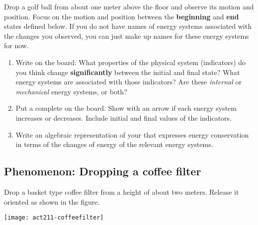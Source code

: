 Drop a golf ball from about one meter above the floor and observe its motion and position.  Focus on the motion and position between the \textbf{beginning} and \textbf{end} states defined below. If you do not have names of energy systems associated with the changes you observed, you can just make up names for these energy systems for now.

\begin{center}
\end{center}

\begin{enumerate}
	\item Write on the board: What properties of the physical system (indicators) do you think change \textbf{significantly} between the initial and final state?  What energy systems are associated with those indicators?  Are these \emph{internal} or \emph{mechanical} energy systems, or both?
	\item Put a complete \EnergyDiagram{} on the board.  Show with an arrow if each energy system increases or decreases. Include initial and final values of the indicators.
	\item Write an algebraic representation of your \EnergyDiagram{} that expresses energy conservation in terms of the changes of energy of the relevant energy systems.  
\end{enumerate}

\WCD 

\subsection{Phenomenon: Dropping a coffee filter}

Drop a basket type coffee filter from a height of about two meters.  Release it oriented as shown in the figure.

\begin{center}
	\texttt{[image: act211-coffeefilter]}

\end{center}

